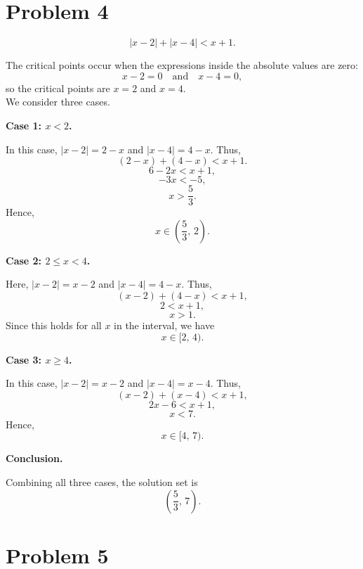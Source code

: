 \documentclass[12pt]{article}
\begin{document}
\section*{Problem 4}

\[
|x-2| + |x-4| < x + 1.
\]

The critical points occur when the expressions inside the absolute values are zero:
\[
x-2 = 0 \quad \text{and} \quad x-4 = 0,
\]
so the critical points are $x = 2$ and $x = 4$.\\

We consider three cases.

\medskip

\textbf{Case 1: $x < 2$.}

In this case, $|x-2| = 2-x$ and $|x-4| = 4-x$.  
Thus,
\[
(2-x) + (4-x) < x + 1.
\]
\[
6 - 2x < x + 1,
\]
\[
-3x < -5,
\]
\[
x > \frac{5}{3}.
\]
Hence,
\[
x \in \left(\frac{5}{3},\,2\right).
\]

\medskip

\textbf{Case 2: $2 \le x < 4$.}

Here, $|x-2| = x-2$ and $|x-4| = 4-x$.  
Thus,
\[
(x-2) + (4-x) < x + 1,
\]
\[
2 < x + 1,
\]
\[
x > 1.
\]
Since this holds for all $x$ in the interval, we have
\[
x \in [2,\,4).
\]

\medskip

\textbf{Case 3: $x \ge 4$.}

In this case, $|x-2| = x-2$ and $|x-4| = x-4$.  
Thus,
\[
(x-2) + (x-4) < x + 1,
\]
\[
2x - 6 < x + 1,
\]
\[
x < 7.
\]
Hence,
\[
x \in [4,\,7).
\]

\medskip

\textbf{Conclusion.}

Combining all three cases, the solution set is
\[
\boxed{\left(\frac{5}{3},\,7\right)}.
\]

\section*{Problem 5}
\end{document}
